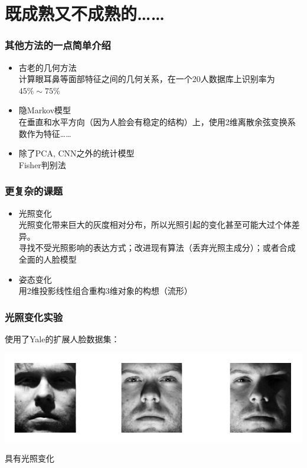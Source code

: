 \documentclass[24pt]{beamer}
\begin{document}
\section{既成熟又不成熟的……}
\begin{frame}
\frametitle{其他方法的一点简单介绍}
\begin{itemize}
\item 古老的几何方法\\
计算眼耳鼻等面部特征之间的几何关系，在一个20人数据库上识别率为$45\% \sim 75\%$\\
\item 隐Markov模型\\
在垂直和水平方向（因为人脸会有稳定的结构）上，使用2维离散余弦变换系数作为特征……\\
\item 除了PCA, CNN之外的统计模型\\
Fisher判别法
\end{itemize}
\end{frame}
\begin{frame}
\frametitle{更复杂的课题}
\begin{itemize}
\item 光照变化\\
光照变化带来巨大的灰度相对分布，所以光照引起的变化甚至可能大过个体差异。\\
寻找不受光照影响的表达方式；改进现有算法（丢弃光照主成分）；或者合成全面的人脸模型
\item 姿态变化\\
用2维投影线性组合重构3维对象的构想（流形）
\end{itemize}
\end{frame}
\begin{frame}
\frametitle{光照变化实验}
使用了Yale的扩展人脸数据集：
\begin{center}
\includegraphics[width=1\linewidth]{./fig25.png}
\end{center}
具有光照变化
\end{frame}
\end{document}

